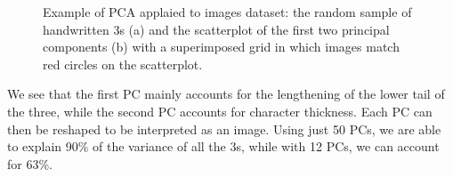 \begin{figure}
    \centering
    \qquad
    \caption[Example of PCA of images.]{Example of PCA applaied to images dataset: the random sample of handwritten 3s (a) and the scatterplot of the first two principal components (b) with a superimposed grid in which images match red circles on the scatterplot\cite{tibshirani_elements_2008}.}
\end{figure}
We see that the first PC mainly accounts for the lengthening of the lower tail of the three, while the second PC accounts for character thickness. Each PC can then be reshaped to be interpreted as an image. Using just 50 PCs, we are able to explain 90\% of the variance of all the 3s, while with 12 PCs, we can account for 63\%.

